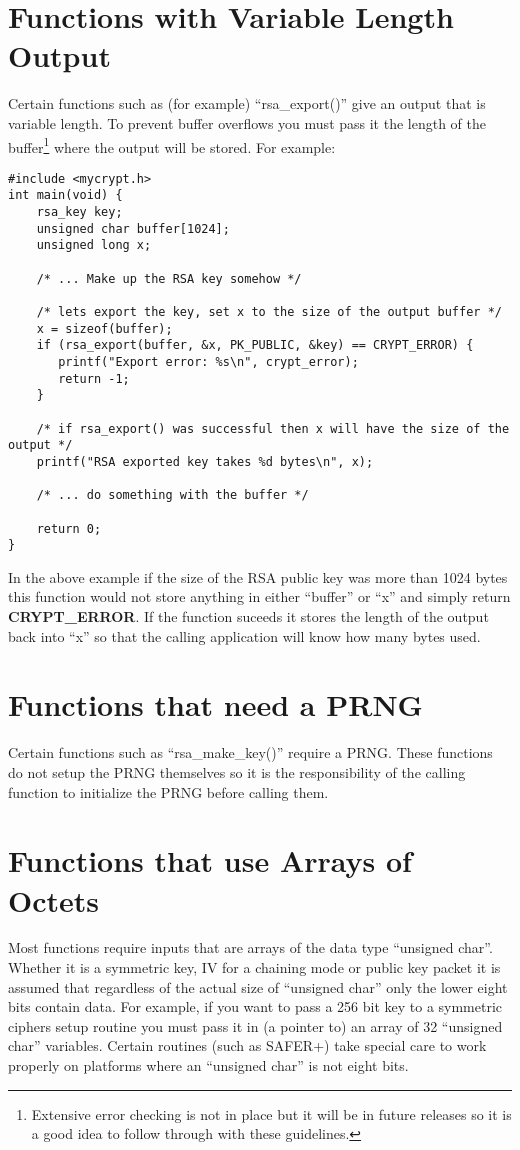 \documentclass{book}
\begin{document}
\section{Functions with Variable Length Output}
Certain functions such as (for example) ``rsa\_export()'' give an output that is variable length.  To prevent buffer overflows you
must pass it the length of the buffer\footnote{Extensive error checking is not in place but it will be in future releases so it is a good idea to follow through with these guidelines.} where
the output will be stored.  For example:
\begin{small}
\begin{verbatim}
#include <mycrypt.h>
int main(void) {
    rsa_key key;
    unsigned char buffer[1024];
    unsigned long x;

    /* ... Make up the RSA key somehow */

    /* lets export the key, set x to the size of the output buffer */
    x = sizeof(buffer);
    if (rsa_export(buffer, &x, PK_PUBLIC, &key) == CRYPT_ERROR) {
       printf("Export error: %s\n", crypt_error);
       return -1;
    }
    
    /* if rsa_export() was successful then x will have the size of the output */
    printf("RSA exported key takes %d bytes\n", x);

    /* ... do something with the buffer */

    return 0;
}
\end{verbatim}
\end{small}
In the above example if the size of the RSA public key was more than 1024 bytes this function would not store anything in
either ``buffer'' or ``x'' and simply return {\bf CRYPT\_ERROR}.  If the function suceeds it stores the length of the output
back into ``x'' so that the calling application will know how many bytes used.

\section{Functions that need a PRNG}
Certain functions such as ``rsa\_make\_key()'' require a PRNG.  These functions do not setup the PRNG themselves so it is 
the responsibility of the calling function to initialize the PRNG before calling them.

\section{Functions that use Arrays of Octets}
Most functions require inputs that are arrays of the data type ``unsigned char''.  Whether it is a symmetric key, IV
for a chaining mode or public key packet it is assumed that regardless of the actual size of ``unsigned char'' only the
lower eight bits contain data.  For example, if you want to pass a 256 bit key to a symmetric ciphers setup routine
you must pass it in (a pointer to) an array of 32 ``unsigned char'' variables.  Certain routines 
(such as SAFER+) take special care to work properly on platforms where an ``unsigned char'' is not eight bits.
\end{document}
